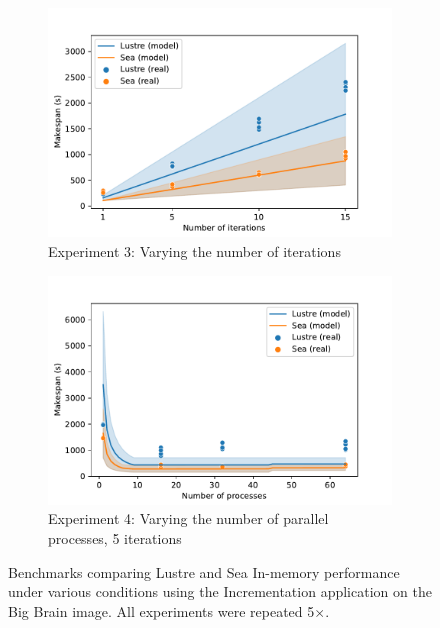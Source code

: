 \begin{figure}
\begin{subfigure}{0.5\columnwidth}
        \centering
        \captionsetup{width=.85\linewidth}
        \includegraphics[width=\linewidth]{figures/sea-comp/iterations.pdf}
        \caption{Experiment 3: Varying the number of iterations}\label{fig:sea-comp:iterations}
    \end{subfigure}
    \begin{subfigure}{0.5\columnwidth}
        \centering
        \captionsetup{width=.85\linewidth}
        \includegraphics[width=\linewidth]{figures/sea-comp/threads.pdf}
        \caption{Experiment 4: Varying the number of parallel processes, 5 iterations}\label{fig:sea-comp:processes}
    \end{subfigure}
    \caption{Benchmarks comparing Lustre and Sea In-memory performance under various conditions using the Incrementation application
    on the Big Brain image. All experiments were repeated 5$\times$.}
    \label{fig:sea-comp:benchmarks}
    \end{figure}

